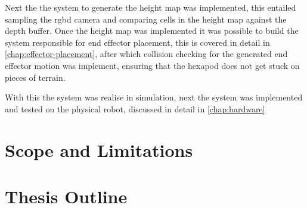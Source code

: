 Next the the system to generate the height map was implemented, this entailed sampling the \ac{rgbd} camera and comparing cells in the height map against the depth buffer.
Once the height map was implemented it was possible to build the system responsible for end effector placement, this is covered in detail in \autoref{chap:effector-placement},
after which collision checking for the generated end effector motion was implement, ensuring that the hexapod does not get stuck on pieces of terrain.

With this the system was realise in simulation, next the system was implemented and tested on the physical robot, discussed in detail in \autoref{chap:hardware}

\section{Scope and Limitations}

\section{Thesis Outline}
